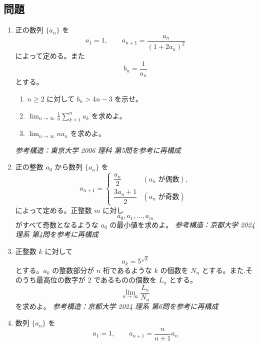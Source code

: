     \subsection{問題}\label{節：大学過去問ベースのもの：問題}
      \begin{enumerate}[label=\textbf{問\arabic*.},leftmargin=3.8em,format=\bookitemlink{practice-entrance}{problem}{answer}]
        \item 正の数列 \(\{a_n\}\) を
          \[
            a_1=1,\qquad
            a_{n+1}=\frac{a_n}{(1+2a_n)^2}
          \]
              によって定める。また
          \[
            b_n=\frac1{a_n}
          \]
              とする。
          \begin{enumerate}[label=(\arabic*)]
            \item \(n\ge2\) に対して \(b_n>4n-3\) を示せ。
            \item \(\displaystyle \lim_{n\to\infty}\frac1n\sum_{k=1}^{n}a_k\) を求めよ。
            \item \(\displaystyle \lim_{n\to\infty}na_n\) を求めよ。
          \end{enumerate}
              \smallskip
              \textit{参考構造：東京大学 2006 理科 第5問を参考に再構成}
        \item 正の整数 \(a_0\) から数列 \(\{a_n\}\) を
          \[
            a_{n+1}=
            \begin{cases}
              \dfrac{a_n}{2} & (a_n\text{ が偶数}),\\[4pt]
              \dfrac{3a_n+1}{2} & (a_n\text{ が奇数})
            \end{cases}
          \]
              によって定める。正整数 \(m\) に対し
          \[
            a_0,a_1,\ldots,a_m
          \]
              がすべて奇数となるような \(a_0\) の最小値を求めよ。
              \smallskip
              \textit{参考構造：京都大学 2024 理系 第4問を参考に再構成}
        \item 正整数 \(k\) に対して
          \[
            a_k=5^{\sqrt{k}}
          \]
              とする。\(a_k\) の整数部分が \(n\) 桁であるような \(k\) の個数を \(N_n\) とする。また,そのうち最高位の数字が \(2\) であるものの個数を \(L_n\) とする。
          \[
            \lim_{n\to\infty}\frac{L_n}{N_n}
          \]
              を求めよ。
              \smallskip
              \textit{参考構造：京都大学 2024 理系 第6問を参考に再構成}
        \item 数列 \(\{a_n\}\) を
          \[
            a_1=1,\qquad
            a_{n+1}=\frac{n}{n+1}a_n
          \]

\end{enumerate}
